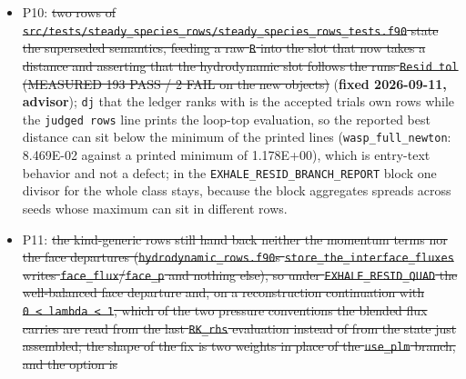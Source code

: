 \documentclass[english,a4paper]{my_memo}
\begin{document}
\begin{itemize}
  P9: \st{the \mbox{\texttt{Coupled\ carrier\ solve}} key comment in
  \mbox{\texttt{src/modules/files\_IO/input\_read.f90}} states that the alternation "was
  measured not to converge and not to be able to" (section 139). The first
  half is what P7 measured against: the alternation with the joint
  acceptance contract of P6 brings every elemental wind row of the atomic
  fixture inside 1e-5 and moves the carrier front monotonically, so the
  comment\textquotesingle s reading is at least narrower than it states. Not my file this
  increment; it needs the sentence rewritten to what section 139 actually
  measured (the old alternation, without the acceptance contract, and its
  sign error on the front\textquotesingle s motion).} (\textbf{fixed 2026-09-11, advisor}.)
\item
  P10: \st{two rows of
  \mbox{\texttt{src/tests/steady\_species\_rows/steady\_species\_rows\_tests.f90}} state the
  superseded semantics, feeding a raw \mbox{\texttt{\textbar{}\textbar{}R\textbar{}\textbar{}}} into the slot that now takes a
  distance and asserting that the hydrodynamic slot follows the run\textquotesingle s
  \mbox{\texttt{Resid\ tol}} (MEASURED 193 PASS / 2 FAIL on the new objects)} (\textbf{fixed
  2026-09-11, advisor}); \texttt{dj} that the ledger ranks with is the accepted
  trial\textquotesingle s own rows while the \texttt{judged\ rows} line prints the loop-top
  evaluation, so the reported best distance can sit below the minimum of the
  printed lines (\texttt{wasp\_full\_newton}: 8.469E-02 against a printed minimum of
  1.178E+00), which is entry-text behavior and not a defect; in the
  \texttt{EXHALE\_RESID\_BRANCH\_REPORT} block one divisor for the whole class stays,
  because the block aggregates spreads across seeds whose maximum can sit in
  different rows.
\item
  P11: \st{the kind-generic rows still hand back neither the momentum terms nor
  the face departures (\mbox{\texttt{hydrodynamic\_rows.f90}}\textquotesingle s
  \mbox{\texttt{store\_the\_interface\_fluxes}} writes \mbox{\texttt{face\_flux}}/\mbox{\texttt{face\_p}} and nothing
  else), so under \mbox{\texttt{EXHALE\_RESID\_QUAD}} the well-balanced face departure
  and, on a reconstruction continuation with \mbox{\texttt{0\ \textless{}\ lambda\ \textless{}\ 1}}, which of the
  two pressure conventions the blended flux carries are read from the last
  \mbox{\texttt{RK\_rhs}} evaluation instead of from the state just assembled; the shape of
  the fix is two weights in place of the \mbox{\texttt{use\_plm}} branch, and the option is
}
\end{itemize}
\end{document}
